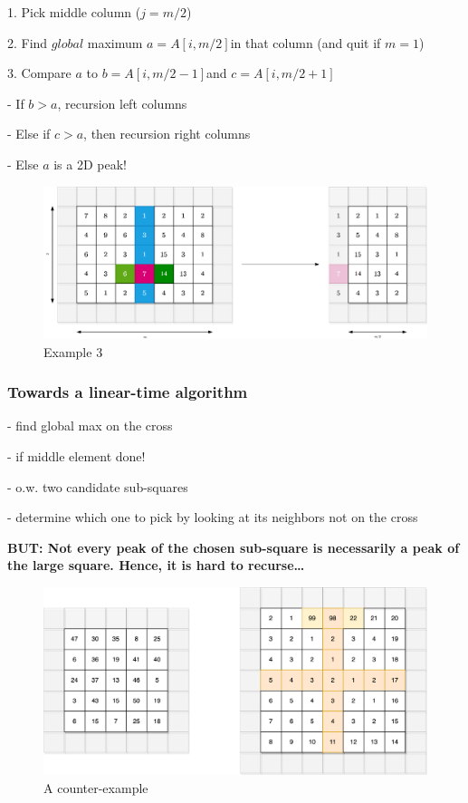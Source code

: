 \documentclass[12pt]{ctexart}
\begin{document}
1. Pick middle column ($j=m/2$)

2. Find $\textit{global}$ maximum $a=A[i,m/2]$in that column (and quit if $m=1$)

3. Compare $a$ to $b=A[i,m/2-1]$and $c=A[i,m/2+1]$

    - If $b>a$, recursion left columns
    
    - Else if $c>a$, then recursion right columns
    
    - Else $a$ is a 2D peak!


\begin{figure}[htbp]
    \centering
    \includegraphics[width=0.98\linewidth]{assets/lec01-2d-eg2.png}
    \caption{Example 3}
\end{figure}

\subsubsection{Towards a linear-time algorithm}

- find global max on the cross

- if middle element done!

- o.w. two candidate sub-squares

- determine which one to pick by looking at its neighbors not on the cross\newline

\textbf{BUT: Not every peak of the chosen sub-square is necessarily
a peak of the large square. Hence, it is hard to recurse…}

\begin{figure}[htbp]
    \centering
    \includegraphics[width=0.88\linewidth]{assets/lec01-leetcode.png}
    \caption{A counter-example}
\end{figure}
\end{document}
